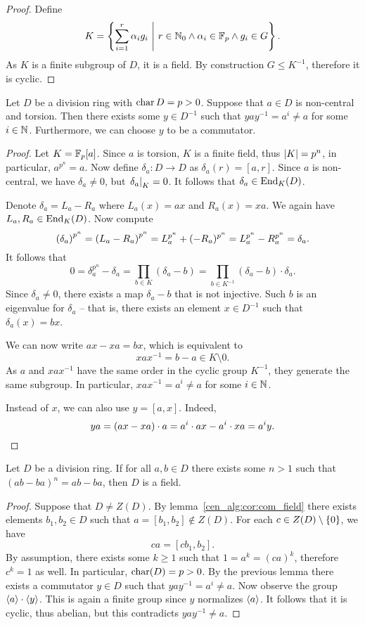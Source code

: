 \begin{proof}
Define
\[
K =
\left\{\sum_{i=1}^r \alpha_i g_i~\middle\vert~r \in \mathbb{N}_0 \land \alpha_i \in \mathbb{F}_p \land g_i \in G\right\}.
\]
As $K$ is a finite subgroup of $D$, it is a field. By construction
$G \leq K^{-1}$, therefore it is cyclic.
\end{proof}

\begin{lema}
Let $D$ be a division ring with $\operatorname{char} D = p > 0$. Suppose that
$a \in D$ is non-central and torsion. Then there exists some
$y \in D^{-1}$ such that $y a y^{-1} = a^i \ne a$ for some
$i \in \mathbb{N}$. Furthermore, we can choose $y$ to be a commutator.
\end{lema}

\begin{proof}
Let $K = \mathbb{F}_p[a]$. Since $a$ is torsion, $K$ is a finite field,
thus $\left\lvert K\right\rvert = p^n$, in particular, $a^{p^n} = a$. Now define
$\delta_a \colon D \to D$ as $\delta_a(r) = [a, r]$. Since $a$ is
non-central, we have $\delta_a \ne 0$, but
$\left. \delta_a\right|_{K}^{} = 0$. It follows that
$\delta_a \in \operatorname{End}_K(D)$.

Denote $\delta_a = L_a - R_a$ where $L_a(x) = ax$ and
$R_a(x) = xa$. We again have $L_a, R_a \in \operatorname{End}_K(D)$. Now compute
\[
\left(\delta_a\right)^{p^n} =
\left(L_a - R_a\right)^{p^n} =
L_a^{p^n} + (-R_a)^{p^n} =
L_a^{p^n} - R_a^{p^n} =
\delta_a.
\]
It follows that
\[
0 = \delta_a^{p^n} - \delta_a =
\prod_{b \in K} (\delta_a - b) =
\prod_{b \in K^{-1}} (\delta_a - b) \cdot \delta_a.
\]
Since $\delta_a \ne 0$, there exists a map $\delta_a - b$ that is
not injective. Such $b$ is an eigenvalue for $\delta_a$ -- that is,
there exists an element $x \in D^{-1}$ such that
$\delta_a(x) = bx$.

We can now write $ax - xa = bx$, which is equivalent to
\[
x a x^{-1} = b - a \in K \setminus{0}.
\]
As $a$ and $x a x^{-1}$ have the same order in the cyclic group
$K^{-1}$, they generate the same subgroup. In particular,
$x a x^{-1} = a^i \ne a$ for some $i \in \mathbb{N}$.

Instead of $x$, we can also use $y = [a, x]$. Indeed,
\[
ya =
(ax - xa) \cdot a =
a^i \cdot ax - a^i \cdot xa =
a^i y. \qedhere
\]
\end{proof}

\begin{izrek}
Let $D$ be a division ring. If for all $a, b \in D$ there exists
some $n > 1$ such that $(ab - ba)^n = ab - ba$, then $D$ is a
field.
\end{izrek}

\begin{proof}
Suppose that $D \ne Z(D)$. By lemma~\ref{cen_alg:cor:com_field}
there exists elements $b_1, b_2 \in D$ such that
$a = [b_1, b_2] \not \in Z(D)$. For each
$c \in Z(D) \setminus \left\{0\right\}$, we have
\[
ca = [c b_1, b_2].
\]
By assumption, there exists some $k \geq 1$ such that
$1 = a^k = (ca)^k$, therefore $c^k = 1$ as well. In particular,
$\operatorname{char}(D) = p > 0$. By the previous lemma there exists a commutator
$y \in D$ such that $y a y^{-1} = a^i \ne a$. Now observe the
group $\left\langle a\right\rangle \cdot \left\langle y\right\rangle$. This is again a finite group since
$y$ normalizes $\left\langle a\right\rangle$. It follows that it is cyclic, thus
abelian, but this contradicts $y a y^{-1} \ne a$.
\end{proof}
